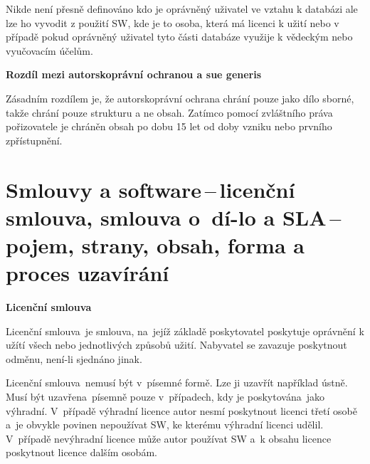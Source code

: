 Nikde není přesně definováno kdo je oprávněný uživatel ve vztahu k databázi ale lze ho vyvodit z použití SW, kde je to osoba, která má licenci k užití nebo v případě pokud oprávněný uživatel tyto části databáze využije k vědeckým nebo vyučovacím účelům.

\vspace{0.3cm}
\begin{Large}
\textbf{Rozdíl mezi autorskoprávní ochranou a sue generis}
\end{Large}

Zásadním rozdílem je, že autorskoprávní ochrana chrání pouze jako dílo sborné, takže chrání pouze strukturu a ne obsah. Zatímco pomocí zvláštního práva pořizovatele je chráněn obsah po dobu 15 let od doby vzniku nebo prvního zpřístupnění.











\newpage
\section[Smlouvy a software\,--\,licenční smlouva, smlouva o~dílo a SLA\,--\,pojem, strany, obsah, forma a proces uzavírání]{Smlouvy a software\,--\,licenční smlouva, smlouva o~dí-lo a SLA\,--\,pojem, strany, obsah, forma a proces uzavírání}

\begin{Large}
\textbf{Licenční smlouva}
\end{Large} 

Licenční smlouva~je smlouva, na~jejíž základě poskytovatel poskytuje oprávnění k užítí všech nebo jednotlivých způsobů užití. Nabyvatel se zavazuje poskytnout odměnu, není-li sjednáno jinak. 

Licenční smlouva~nemusí být v~písemné formě. Lze ji uzavřít například ústně. Musí být uzavřena~písemně pouze v~případech, kdy je poskytována~jako výhradní. V~případě výhradní licence autor nesmí poskytnout licenci třetí osobě a~je obvykle povinen nepoužívat SW, ke kterému výhradní licenci udělil. V~případě nevýhradní licence může autor používat SW a~k obsahu licence poskytnout licence dalším osobám. 
\newline

